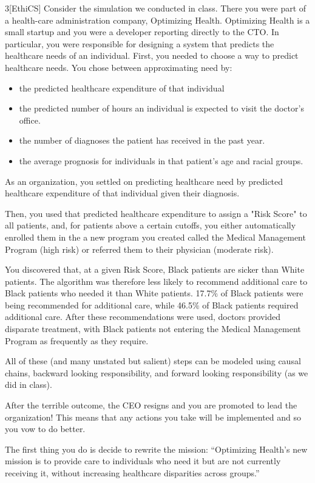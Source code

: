 \documentclass[expanded]{lkx_pset}
\begin{document}
\begin{problem}{3}[EthiCS]
Consider the simulation we conducted in class. There you were part of a health-care administration company, Optimizing Health. Optimizing Health is a small startup and you were a developer reporting directly to the CTO. In particular, you were responsible for designing a system that predicts the healthcare needs of an individual. First, you needed to choose a way to predict healthcare needs. You chose between approximating need by:

\begin{itemize}
	\item the predicted healthcare expenditure of that individual
	\item the predicted number of hours an individual is expected to visit the doctor’s office.
	\item the number of diagnoses the patient has received in the past year.
	\item the average prognosis for individuals in that patient’s age and racial groups.
\end{itemize}

As an organization, you settled on predicting healthcare need by predicted healthcare expenditure of that individual given their diagnosis.

Then, you used that predicted healthcare expenditure to assign a "Risk Score" to all patients, and, for patients above a certain cutoffs, you either automatically enrolled them in the a new program you created called the Medical Management Program (high risk) or referred them to their physician (moderate risk).

You discovered that, at a given Risk Score, Black patients are sicker than White patients. The algorithm was therefore less likely to recommend additional care to Black patients who needed it than White patients. 17.7$\%$ of Black patients were being recommended for additional care, while 46.5$\%$ of Black patients required additional care. After these recommendations were used, doctors provided disparate treatment, with Black patients not entering the Medical Management Program as frequently as they require.

All of these (and many unstated but salient) steps can be modeled using causal chains, backward looking responsibility, and forward looking responsibility (as we did in class).

After the terrible outcome, the CEO resigns and you are promoted to lead the organization! This means that any actions you take will be implemented and so you vow to do better.

The first thing you do is decide to rewrite the mission: “Optimizing Health’s new mission is to provide care to individuals who need it but are not currently receiving it, without increasing healthcare disparities across groups.”

\end{problem}
\end{document}
